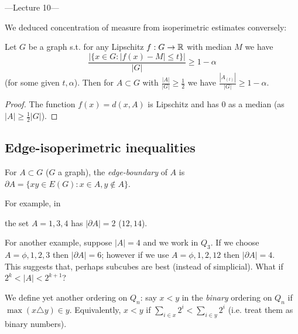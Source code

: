 \documentclass[a4paper]{article}
\begin{document}
---Lecture 10---

We deduced concentration of measure from isoperimetric estimates conversely:

\begin{prop}
    Let $G$ be a graph s.t. for any Lipschitz $f:G \to \mathbb{R}$ with median $M$ we have 
    $$\frac{|\{x \in G:|f(x)-M| \leq t\}|}{|G|} \geq 1-\alpha$$
    (for some given $t,\alpha$). Then for $A \subset G$ with $\frac{|A|}{|G|} \geq \frac{1}{2}$ we have $\frac{|A_{(t)}|}{|G|} \geq 1-\alpha$.
    \begin{proof}
        The function $f(x) = d(x,A)$ is Lipschitz and has $0$ as a median (as $|A| \geq \frac{1}{2}|G|$).
    \end{proof}
\end{prop}

\subsection{Edge-isoperimetric inequalities}

For $A \subset G$ ($G$ a graph), the \emph{edge-boundary} of $A$ is $\partial A = \{xy \in E(G): x \in A, y \not\in A\}$.

For example, in


the set $A=1,3,4$ has $|\partial A|=2$ ($12,14$). 

For another example, suppose $|A|=4$ and we work in $Q_3$. If we choose $A=\phi,1,2,3$ then $|\partial A| = 6$; however if we use $A=\phi,1,2,12$ then $|\partial A| = 4$.\\
This suggests that, perhaps subcubes are best (instead of simplicial). What if $2^k < |A| < 2^{k+1}$?

We define yet another ordering on $Q_n$: say $x<y$ in the \emph{binary} ordering on $Q_n$ if $\max(x \triangle y) \in y$. Equivalently, $x<y$ if $\sum_{i \in x} 2^i < \sum_{i \in y} 2^i$ (i.e. treat them as binary numbers).
\end{document}
